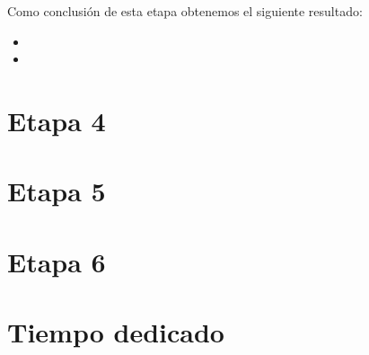 Como conclusión de esta etapa obtenemos el siguiente resultado:
\begin{itemize}
	\item 
	\item 
\end{itemize}


\section{Etapa 4}
\thispagestyle{empty}


\section{Etapa 5}
\thispagestyle{empty}



\section{Etapa 6}
\thispagestyle{empty}


\section{Tiempo dedicado}
\thispagestyle{empty}